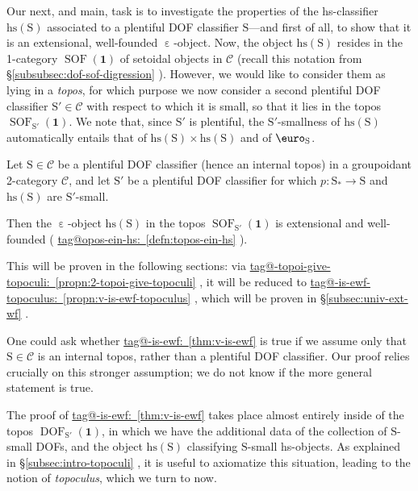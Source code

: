 \documentclass{amsart}
\makeatletter
\newcommand\cC{\mathcal{C}}
\newcommand\DOF{\operatorname{DOF}}
\newcommand\Ein{\mathrel{\text{\textup{\euro}}}}
\newcommand\ein{\mathrel{\varepsilon}}
\newcommand\hs{\mathrm{hs}}
\newcommand\rS{\mathrm{S}}
\newcommand\SOF{\operatorname{SOF}}
\newcommand\tm{\mathbf{1}}
\newcommand\unein{{\ein}}
\newcommand\tagword[1]{\csname tag@#1\endcsname}
\def\label@tag#1:#2\@nil{#1}
\newcommand\labeltag[1]{\label@tag#1:\@nil}
\newcommand\jref[1]{%
  \texorpdfstring%
    {\hyperref[#1]{\tagword{\labeltag{#1}}~\ref*{#1}}}%
    {\tagword{\labeltag{#1}}~\ref*{#1}}%
}
\newcommand\prerefpost[3]{%
  \texorpdfstring%
    {\hyperref[#2]{#1\ref*{#2}#3}}%
    {#1\ref*{#2}#3}%
}
\newcommand\sref[1]{\prerefpost{\S}{#1}{}}
\theoremstyle{definition}
\theoremstyle{remark}
\theoremstyle{plainwithref}
\makeatother
\begin{document}
Our next, and main, task is to investigate the properties of the hs-classifier \( \hs(\rS) \) associated to a plentiful DOF classifier \( \rS \)---and first of all, to show that it is an extensional, well-founded \( \unein \)-object.
Now, the object \( \hs(\rS) \) resides in the 1-category \( \SOF(\tm) \) of setoidal objects in \( \cC \) (recall this notation from \sref{subsubsec:dof-sof-digression}).
However, we would like to consider them as lying in a \emph{topos}, for which purpose we now consider a second plentiful DOF classifier \( \rS' \in \cC \) with respect to which it is small, so that it lies in the topos \( \SOF_{\rS'}(\tm) \).
We note that, since \( \rS' \) is plentiful, the \( \rS' \)-smallness of \( \hs(\rS) \) automatically entails that of \( \hs(\rS) \times \hs(\rS) \) and of \( \Ein_{\rS} \).

\begin{thm} \label{thm:v-is-ewf}
  Let \( \rS \in \cC \) be a plentiful DOF classifier (hence an internal topos) in a groupoidant 2-category \( \cC \), and let \( \rS' \) be a plentiful DOF classifier for which \( p \colon \rS_* \to \rS \) and \( \hs(\rS) \) are \( \rS' \)-small.

  Then the \( \unein \)-object \( \hs(\rS) \) in the topos \( \SOF_{\rS'}(\tm) \) is extensional and well-founded (\jref{defn:topos-ein-hs}).
\end{thm}

\noindent
This will be proven in the following sections: via \jref{propn:2-topoi-give-topoculi}, it will be reduced to \jref{propn:v-is-ewf-topoculus}, which will be proven in \sref{subsec:univ-ext-wf}.

\begin{rmk}
  One could ask whether \jref{thm:v-is-ewf} is true if we assume only that \( \rS \in \cC \) is an internal topos, rather than a plentiful DOF classifier.
  Our proof relies crucially on this stronger assumption; we do not know if the more general statement is true.
\end{rmk}

The proof of \jref{thm:v-is-ewf} takes place almost entirely inside of the topos \( \DOF_{\rS'}(\tm) \), in which we have the additional data of the collection of \( \rS \)-small DOFs, and the object \( \hs(\rS) \) classifying \( \rS \)-small hs-objects.
As explained in \sref{subsec:intro-topoculi}, it is useful to axiomatize this situation, leading to the notion of \emph{topoculus}, which we turn to now.
\end{document}
